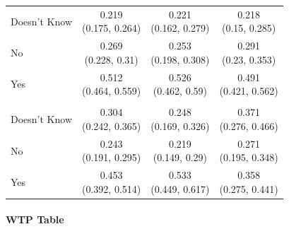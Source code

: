 \documentclass[
]{article}
\begin{document}
\begin{table}
\begin{tabular}[t]{lccc}
\addlinespace[0.3em]
\hline
\multicolumn{4}{l}{\textbf{Ink}}\\
\hline
\hspace{1em}Doesn't Know & \makecell[c]{0.219\\(0.175, 0.264)} & \makecell[c]{0.221\\(0.162, 0.279)} & \makecell[c]{0.218\\(0.15, 0.285)}\\
\hspace{1em}No & \makecell[c]{0.269\\(0.228, 0.31)} & \makecell[c]{0.253\\(0.198, 0.308)} & \makecell[c]{0.291\\(0.23, 0.353)}\\
\hspace{1em}Yes & \makecell[c]{0.512\\(0.464, 0.559)} & \makecell[c]{0.526\\(0.462, 0.59)} & \makecell[c]{0.491\\(0.421, 0.562)}\\
\addlinespace[0.3em]
\hline
\multicolumn{4}{l}{\textbf{Control}}\\
\hline
\hspace{1em}Doesn't Know & \makecell[c]{0.304\\(0.242, 0.365)} & \makecell[c]{0.248\\(0.169, 0.326)} & \makecell[c]{0.371\\(0.276, 0.466)}\\
\hspace{1em}No & \makecell[c]{0.243\\(0.191, 0.295)} & \makecell[c]{0.219\\(0.149, 0.29)} & \makecell[c]{0.271\\(0.195, 0.348)}\\
\hspace{1em}Yes & \makecell[c]{0.453\\(0.392, 0.514)} & \makecell[c]{0.533\\(0.449, 0.617)} & \makecell[c]{0.358\\(0.275, 0.441)}\\
\bottomrule
\end{tabular}
\end{table}

\paragraph{WTP Table}\label{wtp-table}
\end{document}
